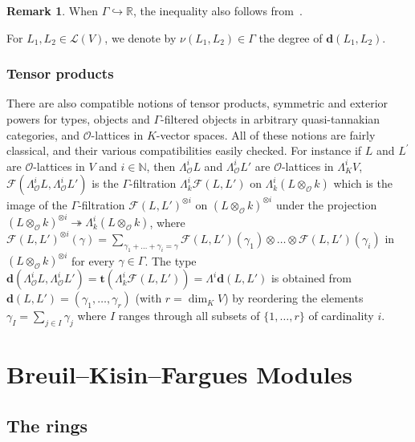 \documentclass[11pt]{article}
\theoremstyle{definition}
\newtheorem{rema}[theo]{Remark}
\numberwithin{equation}{section}
\numberwithin{figure}{section}
\numberwithin{table}{section}
\begin{document}
\begin{rema}
When $\Gamma\hookrightarrow\mathbb{R}$, the inequality also follows from~\cite[5.2.10 \& 6.1]{Co14}.
\end{rema}

For $L_{1},L_{2}\in\mathcal{L}(V)$, we denote by $\nu(L_{1},L_{2})\in\Gamma$ the degree of $\mathbf{d}(L_{1},L_{2})$.

\subsubsection{Tensor products}\label{subsec:TensorProd}

There are also compatible notions of tensor products, symmetric and exterior powers for types, objects and $\Gamma$-filtered objects in arbitrary quasi-tannakian categories, and $\mathcal{O}$-lattices in $K$-vector spaces. All of these notions are fairly classical, and their various compatibilities easily checked. For instance if $L$ and $L^{\prime}$ are $\mathcal{O}$-lattices in $V$ and $i\in\mathbb{N}$, then $\Lambda_{\mathcal{O}}^{i}L$ and $\Lambda_{\mathcal{O}}^{i}L'$ are $\mathcal{O}$-lattices in $\Lambda_{K}^{i}V$, $\mathcal{F}(\Lambda_{\mathcal{O}}^{i}L,\Lambda_{\mathcal{O}}^{i}L')$ is the $\Gamma$-filtration $\Lambda_{k}^{i}\mathcal{F}(L,L')$ on $\Lambda_{k}^{i}(L\otimes_{\mathcal{O}}k)$ which is the image of the $\Gamma$-filtration $\mathcal{F}(L,L')^{\otimes i}$ on $(L\otimes_{\mathcal{O}}k)^{\otimes i}$ under the projection $(L\otimes_{\mathcal{O}}k)^{\otimes i}\twoheadrightarrow\Lambda_{k}^{i}(L\otimes_{\mathcal{O}}k)$, where $\mathcal{F}(L,L')^{\otimes i}(\gamma)=\sum_{\gamma_{1}+\dots+\gamma_{i}=\gamma}\mathcal{F}(L,L')(\gamma_{1})\otimes\dots\otimes\mathcal{F}(L,L')(\gamma_{i})$ in $(L\otimes_{\mathcal{O}}k)^{\otimes i}$ for every $\gamma\in\Gamma$. The type $\mathbf{d}(\Lambda_{\mathcal{O}}^{i}L,\Lambda_{\mathcal{O}}^{i}L')=\mathbf{t}(\Lambda_{k}^{i}\mathcal{F}(L,L'))=\Lambda^{i}\mathbf{d}(L,L')$ is obtained from $\mathbf{d}(L,L')=(\gamma_{1},\dots,\gamma_{r})$ (with $r=\dim_{K}V$) by reordering the elements $\gamma_{I}=\sum_{j\in I}\gamma_{j}$ where $I$ ranges through all subsets of $\{1,\dots,r\}$ of cardinality $i$.


\section{Breuil--Kisin--Fargues Modules}\label{sec:BKF-Modules}

\subsection{The rings}\label{subsec:TheRings}
\end{document}
